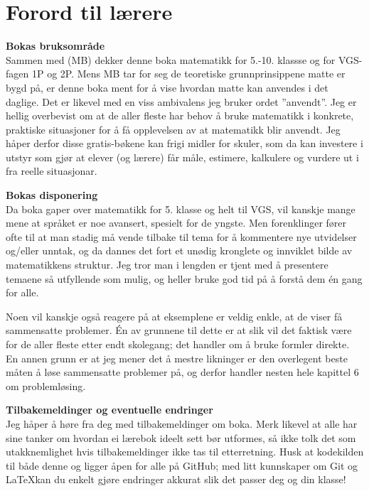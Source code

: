


\newpage
\section*{Forord til lærere}
\textbf{Bokas bruksområde}\\
Sammen med  (MB) dekker denne boka matematikk for 5.-10. klassse og for VGS-fagen 1P og 2P. Mens MB tar for seg de teoretiske grunnprinsippene matte er bygd på, er denne boka ment for å vise hvordan matte kan anvendes i det daglige. Det er likevel med en viss ambivalens jeg bruker ordet ''anvendt''. Jeg er hellig overbevist om at de aller fleste har behov å bruke matematikk i konkrete, praktiske situasjoner for å få opplevelsen av at matematikk blir anvendt. Jeg håper derfor disse gratis-bøkene kan frigi midler for skuler, som da kan investere i utstyr som gjør at elever (og lærere) får måle, estimere, kalkulere og vurdere ut i fra reelle situasjonar.\vsk

\textbf{Bokas disponering} \\
Da boka gaper over matematikk for 5. klasse og helt til VGS, vil kanskje mange mene at språket er noe avansert, spesielt for de yngste. Men forenklinger fører ofte til at man stadig må vende tilbake til tema for å kommentere nye utvidelser og/eller unntak, og da dannes det fort et unødig kronglete og innviklet bilde av matematikkens struktur. Jeg tror man i lengden er tjent med å presentere temaene så utfyllende som mulig, og heller bruke god tid på å forstå dem én gang for alle.\vsk

Noen vil kanskje også reagere på at eksemplene er veldig enkle, at de viser få sammensatte problemer. Én av grunnene til dette er at slik vil det faktisk være for de aller fleste etter endt skolegang; det handler om å bruke formler direkte. En annen grunn er at jeg mener det å mestre likninger er den overlegent beste måten å løse sammensatte problemer på, og derfor handler nesten hele kapittel 6 om problemløsing.\vsk

\textbf{Tilbakemeldinger og eventuelle endringer} \\
Jeg håper å høre fra deg med tilbakemeldinger om boka. Merk likevel at alle har sine tanker om hvordan ei lærebok ideelt sett bør utformes, så ikke tolk det som utakknemlighet hvis tilbakemeldinger ikke tas til etterretning. Husk at kodekilden til både denne  og \mb\;ligger åpen for alle på GitHub; med litt kunnskaper om Git og \LaTeX kan du enkelt gjøre endringer akkurat slik det passer deg og din klasse!


